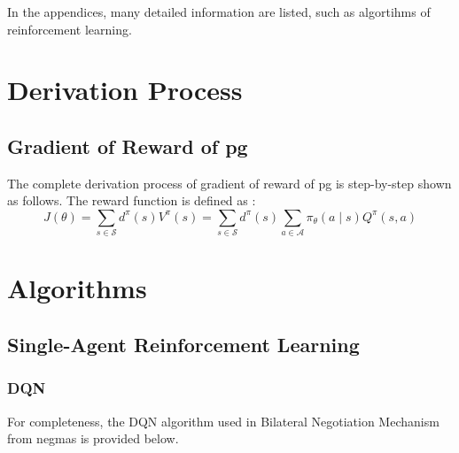 \begin{appendices}
In the appendices, many detailed information are listed, such as algortihms of reinforcement learning.
	\chapter{Derivation Process}
	\section{Gradient of Reward of \gls{pg}} \label{derivation-process-gradient-pg}
	The complete derivation process of gradient of reward of \gls{pg} is step-by-step shown as follows.
	The reward function is defined as :
	\begin{equation}
	J(\theta)=\sum_{s \in \mathcal{S}} d^{\pi}(s) V^{\pi}(s)=\sum_{s \in \mathcal{S}} d^{\pi}(s) \sum_{a \in \mathcal{A}} \pi_{\theta}(a \mid s) Q^{\pi}(s, a)
\end{equation}
	
  \chapter{Algorithms}
  \section{Single-Agent Reinforcement Learning}
	\subsection{DQN} \label{appendix:dqn}
	For completeness, the DQN algorithm used in Bilateral Negotiation Mechanism from \gls{negmas} is provided below.
	

\end{appendices}
